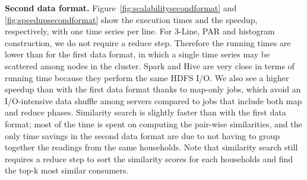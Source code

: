 \documentclass[prodmode,acmtods]{acmsmall}
\begin{document}
\begin{figure*}[t]
 \centering
 \hspace{-8pt}
 \hspace{-8pt}
 \hspace{-8pt}
 \caption{Speedup obtained using the second data format in Spark and Hive.}
  \label{fig:speedupsecondformat}
\end{figure*}

{\bf Second data format.}  Figure~\ref{fig:scalabilitysecondformat} and \ref{fig:speedupsecondformat} show the execution times and the speedup, respectively, with one time series per line.  For 3-Line, PAR and histogram construction, we do not require a reduce step.  Therefore the running times are lower than for the first data format, in which a single time series may be scattered among nodes in the cluster.  Spark and Hive are very close in terms of running time because they perform the same HDFS I/O.  We also see a higher speedup than with the first data format thanks to map-only jobs, which avoid an I/O-intensive data shuffle among servers compared to jobs that include both map and reduce phases.
Similarity search is slightly faster than with the first data format; most of the time is spent on computing the pair-wise similarities, and the only time savings in the second data format are due to not having to group together the readings from the same households.  Note that similarity search still requires a reduce step to sort the similarity scores for each households and find the top-k most similar consumers.  

\begin{figure*}[t]
 \centering
 \hspace{-5pt}
 \hspace{-5pt}
 \caption{Execution times using the third data format in Spark and Hive.}
  \label{fig:scalabilitythirdformat}
\end{figure*}
\end{document}
